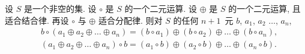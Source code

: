 \begin{theorem}
    设 \(S\) 是一个非空的集.
    设 \(\circ\) 是 \(S\) 的一个二元运算.
    设 \(\oplus\) 是 \(S\) 的一个二元运算,
    且适合结合律.
    再设 \(\circ\) 与 \(\oplus\) 适合分配律.
    则对 \(S\) 的任何 \(n + 1\)~元
    \(b\), \(a_1\), \(a_2\) \(\dots\), \(a_n\),
    \begin{align*}
         &
        b \circ (a_1 \oplus a_2 \oplus \dots \oplus a_n)
        =
        (b \circ a_1) \oplus (b \circ a_2) \oplus
        \dots \oplus (b \circ a_n),
        \\
         &
        (a_1 \oplus a_2 \oplus \dots \oplus a_n) \circ b
        =
        (a_1 \circ b) \oplus (a_2 \circ b) \oplus
        \dots \oplus (a_n \circ b).
    \end{align*}
\end{theorem}
